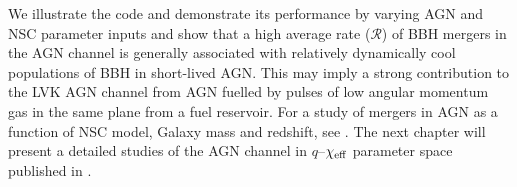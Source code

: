 We illustrate the code and demonstrate its performance by varying AGN and NSC parameter inputs and show that a high average rate ($\mathcal{R}$) of BBH mergers in the AGN channel is generally associated with relatively dynamically cool populations of BBH in short-lived AGN.
This may imply a strong contribution to the LVK AGN channel from AGN fuelled by pulses of low angular momentum gas in the same plane from a fuel reservoir.
For a study of mergers in AGN as a function of NSC model, Galaxy mass and redshift, see \citet{Delfavero+25-mcfactsIII}.
The next chapter will present a detailed studies of the AGN channel in $q$--$\chi_{\rm eff}$ parameter space published in \citet{Cook+25}.

